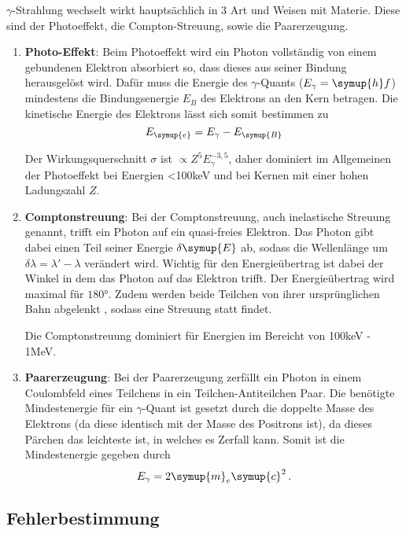 \noindent
$\gamma$-Strahlung wechselt wirkt hauptsächlich in 3 Art und Weisen mit Materie. 
Diese sind der Photoeffekt, die Compton-Streuung, sowie die Paarerzeugung.
\begin{enumerate}
  \item \textbf{Photo-Effekt}:
  Beim Photoeffekt wird ein Photon vollständig von einem gebundenen Elektron absorbiert so, dass dieses aus seiner Bindung herausgelöst wird. 
  Dafür muss die Energie des $\gamma$-Quants ($E_\gamma = \symup{h}f$) mindestens die Bindungsenergie $E_B$ des Elektrons an den Kern betragen. Die
  kinetische Energie des Elektrons lässt sich somit bestimmen zu 
  \begin{equation}
    E_{\symup{e}} = E_\gamma - E_{\symup{B}}
    \label{eqn:1}
  \end{equation}

  \noindent
  Der Wirkungsquerschnitt $\sigma$ ist $\propto Z^5E_\gamma^{-3,5}$, daher dominiert im Allgemeinen 
  der Photoeffekt bei Energien <100keV und bei Kernen mit einer hohen Ladungszahl $Z$.

  \item \textbf{Comptonstreuung}:
  Bei der Comptonstreuung,  auch inelastische Streuung genannt, trifft ein Photon auf ein quasi-freies Elektron. 
  Das Photon gibt dabei einen Teil seiner Energie $\delta \symup{E}$
  ab, sodass die Wellenlänge um $\delta\lambda = \lambda' - \lambda $ verändert wird.
  Wichtig für den Energieübertrag ist dabei der Winkel in dem das Photon auf das Elektron trifft. Der 
  Energieübertrag wird maximal für $180°$. Zudem werden beide Teilchen von ihrer ursprünglichen Bahn abgelenkt
, sodass eine Streuung statt findet.

\noindent
Die Comptonstreuung dominiert für Energien im Bereicht von 100keV - 1MeV.


  \item \textbf{Paarerzeugung}:
  Bei der Paarerzeugung zerfällt ein Photon in einem Coulombfeld eines Teilchens in ein Teilchen-Antiteilchen Paar.
  Die benötigte Mindestenergie für ein $\gamma$-Quant ist gesetzt durch die doppelte Masse des Elektrons (da diese
  identisch mit der Masse des Positrons ist), da dieses Pärchen das leichteste ist, in welches es Zerfall kann.
  Somit ist die Mindestenergie gegeben durch 
  \begin{equation}
    E_\gamma =  2 \symup{m}_e \symup{c}^2 \, .
    \label{eqn:3}
  \end{equation}
\end{enumerate}


\subsection{Fehlerbestimmung}